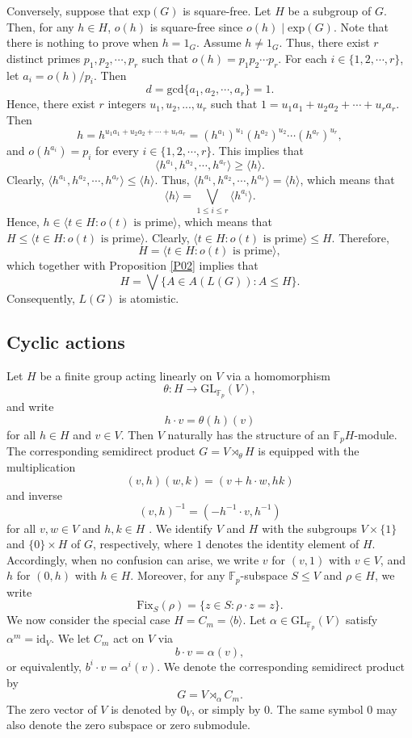 \documentclass[12pt]{article}
\def\QEDopen{{\setlength{\fboxsep}{0pt}\setlength{\fboxrule}{0.2pt}\fbox{\rule[0pt]{0pt}{1.3ex}\rule[0pt]{1.3ex}{0pt}}}}
\def\QED{\QEDopen}
\def\endproof{\hspace*{\fill}~\QED\par\endtrivlist\unskip}
\begin{document}
Conversely, suppose that $\mbox{exp}(G)$ is square-free. Let $H$ be a subgroup of $G$. Then, for any $h\in H$, $o(h)$ is square-free since $o(h)\mid \mbox{exp}(G)$. Note that there is nothing to prove when $h=1_G$. Assume $h\neq 1_G$. Thus, there exist $r$ distinct primes $p_1, p_2,\cdots,p_r$ such that $o(h)=p_1p_2\cdots p_r$. For each $i\in \{1,2,\cdots,r\}$, let $a_i=o(h)/p_i$. Then
$$d=\mbox{gcd}\{a_1,a_2,\cdots,a_r\}=1.$$
Hence, there exist $r$ integers $u_1, u_2,...,u_r$ such that 
$1=u_1a_1+ u_2a_2+\cdots+u_ra_r$. Then $$h=h^{u_1a_1+u_2a_2+\cdots+u_ra_r}=(h^{a_1})^{u_1}(h^{a_2})^{u_2}\cdots(h^{a_r})^{u_r},$$ 
and $o(h^{a_i})=p_i$ for every $i\in \{1,2,\cdots,r\}$.
This implies that 
$$\langle h^{a_1},h^{a_2},\cdots,h^{a_r}\rangle\geq\langle h\rangle.$$
Clearly, 
$\langle h^{a_1},h^{a_2},\cdots,h^{a_r}\rangle\leq\langle h\rangle$. Thus,
$\langle h^{a_1},h^{a_2},\cdots,h^{a_r}\rangle=\langle h\rangle$,
which means that
$$\langle h\rangle=\bigvee_{1\leq i\leq r}\langle h^{a_i}\rangle.$$
Hence, $h\in \langle t\in H: o(t) \mbox{ is prime}\rangle$, 
which means that $H\leq \langle t\in H: o(t) \mbox{ is prime}\rangle$. 
Clearly, $\langle t\in H: o(t) \mbox{ is prime}\rangle\leq H$. 
Therefore,
$$H=\langle t\in H: o(t) \mbox{ is prime}\rangle,$$ 
which together with Proposition \ref{P02} implies that 
$$H=\bigvee \{A\in A(L(G)): A\leq H\}.$$
Consequently, $L(G)$ is atomistic.
\endproof

\subsection{Cyclic actions}
Let $H$ be a finite group acting linearly on $V$ via a homomorphism
$$\theta:H\longrightarrow \mbox{GL}_{\mathbb{F}_p}(V),$$
and write $$h\cdot v=\theta(h)(v)$$
for all $h\in H$ and $v\in V$. Then $V$ naturally has 
the structure of an $\mathbb{F}_pH$-module. 
The corresponding semidirect product $G=V\rtimes_{\theta} H$ 
is equipped with the multiplication
$$(v,h)(w,k)=(v+h\cdot w,hk)$$
and inverse
$$(v,h)^{-1}=(-h^{-1}\cdot v,h^{-1})$$
for all $v,w\in V$ and $h,k\in H$ \cite{Rotman, Webb}. 
We identify $V$ and $H$ with the subgroups $V\times \{1\}$ 
and $\{0\}\times H$ of $G$, respectively, 
where $1$ denotes the identity element of $H$. 
Accordingly, when no confusion can arise, 
we write $v$ for $(v,1)$ with $v\in V$, and $h$ for $(0,h)$ with $h\in H$.
Moreover, for any $\mathbb{F}_p$-subspace $S\leq V$ and $\rho\in H$, we write 
$$\mbox{Fix}_{S}(\rho)=\{z\in S:\rho\cdot z=z\}.$$
We now consider the special case $H=C_m=\langle b\rangle$. 
Let $\alpha\in \mbox{GL}_{\mathbb{F}_p}(V)$ satisfy $\alpha^m=\mbox{id}_V$. 
We let $C_m$ act on $V$ via $$b\cdot v=\alpha(v),$$
or equivalently, $b^i\cdot v=\alpha^i(v)$. 
We denote the corresponding semidirect product 
by $$G=V\rtimes_{\alpha} C_m.$$
The zero vector of $V$ is denoted by $0_V$, 
or simply by $0$. The same symbol $0$ may 
also denote the zero subspace or zero submodule.
\end{document}
